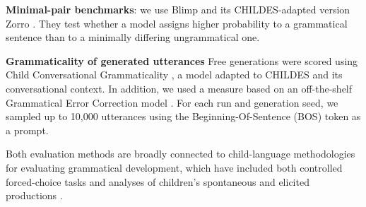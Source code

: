 \noindent  \textbf{Minimal-pair benchmarks}: we use Blimp \cite{warstadt2020blimp} and its CHILDES-adapted version Zorro \cite{huebner_babyberta_2021}. They test whether a model assigns higher probability to a grammatical sentence than to a minimally differing ungrammatical one. 

\noindent \textbf{Grammaticality of generated utterances} Free generations were scored using Child Conversational Grammaticality  \cite[ChildCG, ][]{nikolaus_automatic_2024}, a model adapted to CHILDES and its conversational context. In addition, we used a measure based on an off-the-shelf Grammatical Error Correction model \cite[e.g.,][]{rothe_simple_2021}. For each run and generation seed, we sampled up to 10,000 utterances using the Beginning-Of-Sentence (BOS) token as a prompt.

Both evaluation methods are broadly connected to child-language methodologies for evaluating grammatical development, which have included both controlled forced-choice tasks and analyses of children’s spontaneous and elicited productions \cite{ambridge2011child}.





